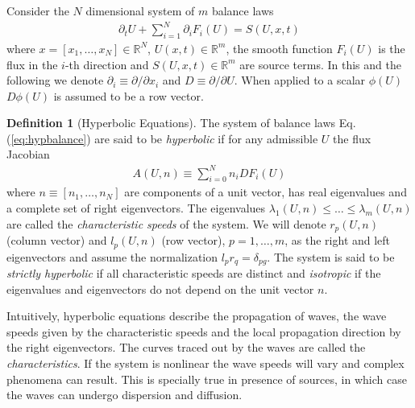 \documentclass[11pt, reqno]{amsart}
\newcommand{\eqr}[1]{Eq.\thinspace(#1)}
\newcommand{\spfrac}[2]{{\partial_{#1}} {#2}}
\theoremstyle{definition}
\newtheorem{dfn}{Definition}
\begin{document}
Consider the $N$ dimensional system of $m$ balance laws
\begin{align}
  \spfrac{t}{U} + \sum_{i=1}^N \spfrac{i}{F_i(U)} = S(U,x,t) 
  \label{eq:hypbalance}
\end{align}
where $x = [x_1,\ldots,x_N] \in \mathbb{R}^N$, $U(x,t) \in
\mathbb{R}^m$, the smooth function $F_i(U)$ is the flux in the $i$-th
direction and $S(U,x,t) \in \mathbb{R}^m$ are source terms. In this
and the following we denote $\partial_i \equiv \partial/\partial x_i$
and $D \equiv \partial/\partial U$. When applied to a scalar $\phi(U)$
$D\phi(U)$ is assumed to be a row vector.

\begin{dfn}[Hyperbolic Equations]
  The system of balance laws \eqr{\ref{eq:hypbalance}} are said to be
  \emph{hyperbolic} if for any admissible $U$ the flux Jacobian
  \begin{align}
    A(U,n) \equiv \sum_{i=0}^N n_i DF_i(U)
  \end{align}
  where $n\equiv [n_1,\ldots,n_N]$ are components of a unit vector,
  has real eigenvalues and a complete set of right eigenvectors. The
  eigenvalues $\lambda_1(U,n) \le \ldots \le \lambda_m(U,n)$ are
  called the \emph{characteristic speeds} of the system. We will
  denote $r_p(U,n)$ (column vector) and $l_p(U,n)$ (row vector),
  $p=1,\ldots,m$, as the right and left eigenvectors and assume the
  normalization $l_p r_q = \delta_{pg}$.  The system is said to be
  \emph{strictly hyperbolic} if all characteristic speeds are distinct
  and \emph{isotropic} if the eigenvalues and eigenvectors do not
  depend on the unit vector $n$.
\end{dfn}

Intuitively, hyperbolic equations describe the propagation of waves,
the wave speeds given by the characteristic speeds and the local
propagation direction by the right eigenvectors. The curves traced out
by the waves are called the \emph{characteristics}. If the system is
nonlinear the wave speeds will vary and complex phenomena can
result. This is specially true in presence of sources, in which case
the waves can undergo dispersion and diffusion.
\end{document}
